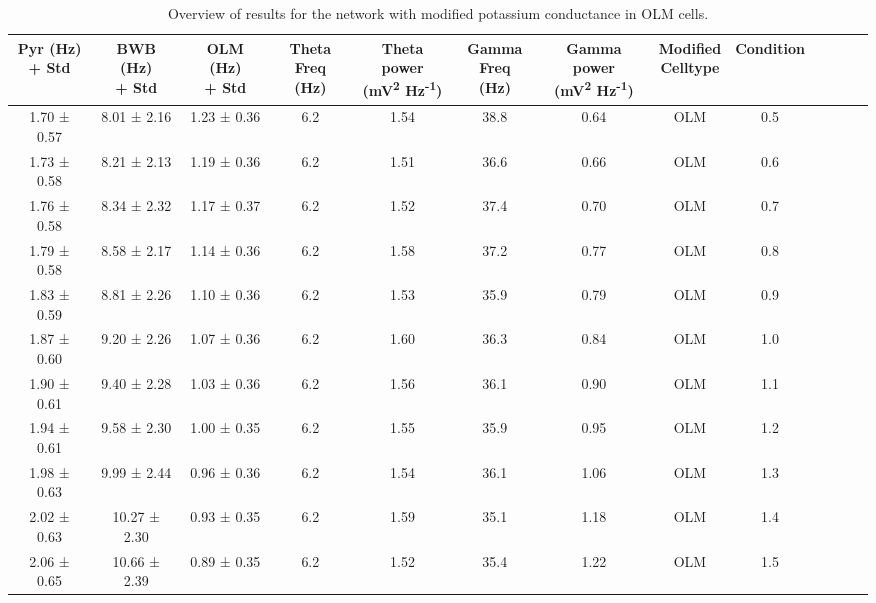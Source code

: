 \begin{table}[htbp]
    \caption[Potassium variant: OLM cell]{Overview of results for the network with modified potassium conductance in OLM cells.}\label{table:K_variant_OLM}
    \begin{adjustbox}{width=\textwidth}
        \begin{tabular}{ccccccccccccc}
            \hline
            \CellWithForcedBreak{Pyr (Hz)                                                   \\ + Std} & \CellWithForcedBreak{BWB (Hz) \\ + Std} & \CellWithForcedBreak{OLM (Hz) \\ + Std} & \CellWithForcedBreak{Theta \\ Freq (Hz)} & \CellWithForcedBreak{Theta power \\ (mV\textsuperscript{2} Hz\textsuperscript{-1})} & \CellWithForcedBreak{Gamma \\ Freq (Hz)} & \CellWithForcedBreak{Gamma power \\ (mV\textsuperscript{2} Hz\textsuperscript{-1})} & \CellWithForcedBreak{Modified \\ Celltype} & Condition \\
            \hline
            1.70 ± 0.57 & 8.01 ± 2.16  & 1.23 ± 0.36 & 6.2 & 1.54 & 38.8 & 0.64 & OLM & 0.5 \\
            1.73 ± 0.58 & 8.21 ± 2.13  & 1.19 ± 0.36 & 6.2 & 1.51 & 36.6 & 0.66 & OLM & 0.6 \\
            1.76 ± 0.58 & 8.34 ± 2.32  & 1.17 ± 0.37 & 6.2 & 1.52 & 37.4 & 0.70 & OLM & 0.7 \\
            1.79 ± 0.58 & 8.58 ± 2.17  & 1.14 ± 0.36 & 6.2 & 1.58 & 37.2 & 0.77 & OLM & 0.8 \\
            1.83 ± 0.59 & 8.81 ± 2.26  & 1.10 ± 0.36 & 6.2 & 1.53 & 35.9 & 0.79 & OLM & 0.9 \\
            1.87 ± 0.60 & 9.20 ± 2.26  & 1.07 ± 0.36 & 6.2 & 1.60 & 36.3 & 0.84 & OLM & 1.0 \\
            1.90 ± 0.61 & 9.40 ± 2.28  & 1.03 ± 0.36 & 6.2 & 1.56 & 36.1 & 0.90 & OLM & 1.1 \\
            1.94 ± 0.61 & 9.58 ± 2.30  & 1.00 ± 0.35 & 6.2 & 1.55 & 35.9 & 0.95 & OLM & 1.2 \\
            1.98 ± 0.63 & 9.99 ± 2.44  & 0.96 ± 0.36 & 6.2 & 1.54 & 36.1 & 1.06 & OLM & 1.3 \\
            2.02 ± 0.63 & 10.27 ± 2.30 & 0.93 ± 0.35 & 6.2 & 1.59 & 35.1 & 1.18 & OLM & 1.4 \\
            2.06 ± 0.65 & 10.66 ± 2.39 & 0.89 ± 0.35 & 6.2 & 1.52 & 35.4 & 1.22 & OLM & 1.5 \\
            \hline
        \end{tabular}
    \end{adjustbox}
\end{table}\pagebreak

